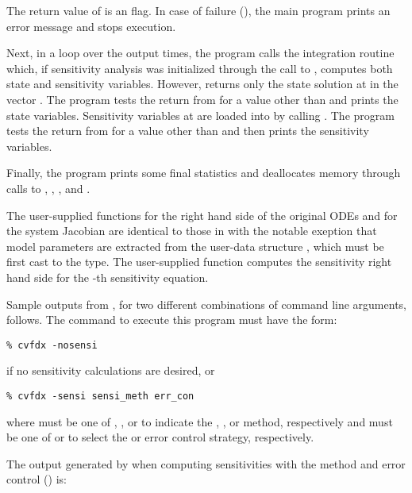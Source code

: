 The return value of  is an  flag. In case of failure
(), the main program prints an error message and stops execution.

Next, in a loop over the  output times, the program calls the integration
routine  which, if sensitivity analysis was initialized through the call
to , computes both state and sensitivity variables. However,
 returns only the state solution at  in the vector .
The program tests the return from  for a value other than  and
prints the state variables.
Sensitivity variables at  are loaded into  by calling .
The program tests the return from  for a value other than  
and then prints the sensitivity variables.

Finally, the program prints some final statistics and deallocates memory through calls
to , , , and .

The user-supplied functions  for the right hand side of the original ODEs and
 for the system Jacobian are identical to those in  with the 
notable exeption that model parameters are extracted from the user-data structure
, which must be first cast to the  type. The user-supplied
function  computes the sensitivity right hand side for the -th 
sensitivity equation.

Sample outputs from , for two different combinations of command line arguments, 
follows. The command to execute this program must have the form:
\begin{verbatim}
% cvfdx -nosensi
\end{verbatim} 
if no sensitivity calculations are desired, or
\begin{verbatim}
% cvfdx -sensi sensi_meth err_con
\end{verbatim}
where  must be one of , , or  to
indicate the , , or  method,
respectively and  must be one of  or  to
select the  or  error control strategy, respectively.

The output generated by  when computing sensitivities with the 
method and  error control () is:
{\small}

